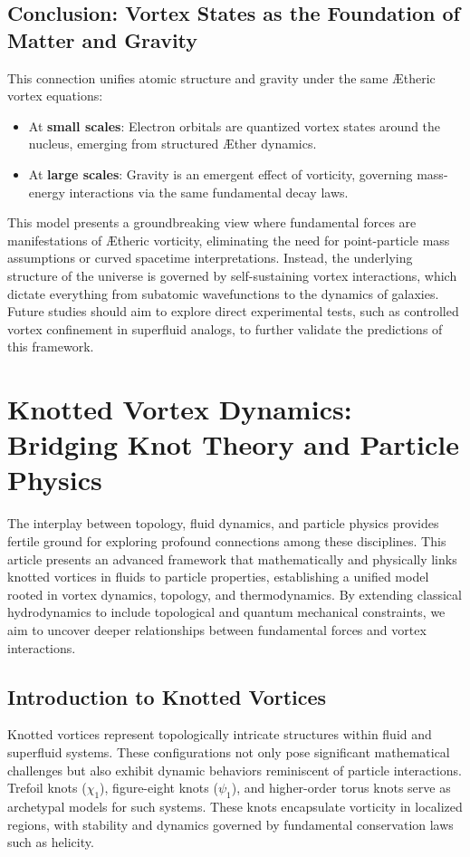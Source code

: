 \documentclass[a4paper,10pt]{article}
\begin{document}
\subsection*{Conclusion: Vortex States as the Foundation of Matter and Gravity}


This connection unifies atomic structure and gravity under the same Ætheric vortex equations:
\begin{itemize}
\item At \textbf{small scales}: Electron orbitals are quantized vortex states around the nucleus, emerging from structured Æther dynamics.
\item At \textbf{large scales}: Gravity is an emergent effect of vorticity, governing mass-energy interactions via the same fundamental decay laws.
\end{itemize}
This model presents a groundbreaking view where fundamental forces are manifestations of Ætheric vorticity, eliminating the need for point-particle mass assumptions or curved spacetime interpretations. Instead, the underlying structure of the universe is governed by self-sustaining vortex interactions, which dictate everything from subatomic wavefunctions to the dynamics of galaxies. Future studies should aim to explore direct experimental tests, such as controlled vortex confinement in superfluid analogs, to further validate the predictions of this framework.

    
\section{Knotted Vortex Dynamics: Bridging Knot Theory and Particle Physics}


The interplay between topology, fluid dynamics, and particle physics provides fertile ground for exploring profound connections among these disciplines. This article presents an advanced framework that mathematically and physically links knotted vortices in fluids to particle properties, establishing a unified model rooted in vortex dynamics, topology, and thermodynamics. By extending classical hydrodynamics to include topological and quantum mechanical constraints, we aim to uncover deeper relationships between fundamental forces and vortex interactions.


\subsection*{Introduction to Knotted Vortices}


Knotted vortices represent topologically intricate structures within fluid and superfluid systems. These configurations not only pose significant mathematical challenges but also exhibit dynamic behaviors reminiscent of particle interactions. Trefoil knots ($\chi_1$), figure-eight knots ($\psi_1$), and higher-order torus knots serve as archetypal models for such systems. These knots encapsulate vorticity in localized regions, with stability and dynamics governed by fundamental conservation laws such as helicity.
\end{document}
